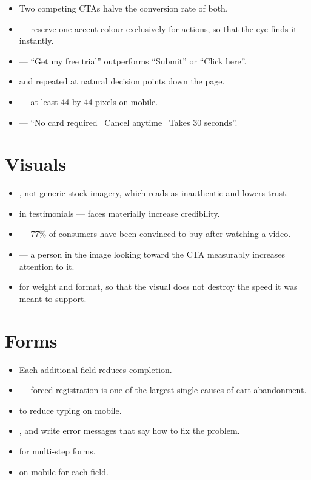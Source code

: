 \documentclass{MMTextbook}
\begin{document}
\begin{itemize}
\item {} Two competing CTAs halve the conversion
      rate of both.
\item {} --- reserve one accent colour exclusively for actions,
      so that the eye finds it instantly.
\item {} --- ``Get my free trial''
      outperforms ``Submit'' or ``Click here''.
\item {} and repeated at natural decision points down
      the page.
\item {} --- at least 44 by 44 pixels on mobile.
\item {} --- ``No card required
      \textbullet\ Cancel anytime \textbullet\ Takes 30 seconds''.
\end{itemize}

\section{Visuals}

\begin{itemize}
\item {}, not generic stock imagery, which
      reads as inauthentic and lowers trust.
\item {} in testimonials --- faces materially
      increase credibility.
\item {} --- 77\% of consumers have been convinced to buy after
      watching a video.
\item {} --- a person in the image looking
      toward the CTA measurably increases attention to it.
\item {} for weight and format, so that the visual does
      not destroy the speed it was meant to support.
\end{itemize}

\section{Forms}

\begin{itemize}
\item {} Each additional field reduces
      completion.
\item {} --- forced registration is one of the largest
      single causes of cart abandonment.
\item {} to reduce typing on
      mobile.
\item {}, and write error messages that say how
      to fix the problem.
\item {} for multi-step forms.
\item {} on mobile for each field.
\end{itemize}
\end{document}

